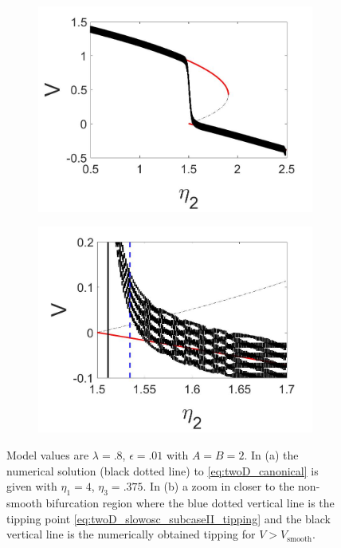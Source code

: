 \begin{figure}[H]
\centering
\begin{subfigure}{.5\textwidth}
  \centering
  \includegraphics[width=\linewidth]{twoD/slowosc_bif_diagram_small.jpg}
  \caption{}
\end{subfigure}%
\begin{subfigure}{.5\textwidth}
  \centering
  \includegraphics[width=\linewidth]{twoD/slowosc_bif_diagram_small_zoom.jpg}
  \caption{}
\end{subfigure}
\caption{Model values are $\lambda=.8$, $\epsilon=.01$ with $A=B=2$. In (a) the numerical solution (black dotted line) to \eqref{eq:twoD_canonical} is given with $\eta_1=4$, $\eta_3=.375$. In (b) a zoom in closer to the non-smooth bifurcation region where the blue dotted vertical line is the tipping point \eqref{eq:twoD_slowosc_subcaseII_tipping} and the black vertical line is the numerically obtained tipping for $V>V_{\text{smooth}}$.}
\label{fig:twoD_slowosc_Vnumerics_small}
\end{figure}

